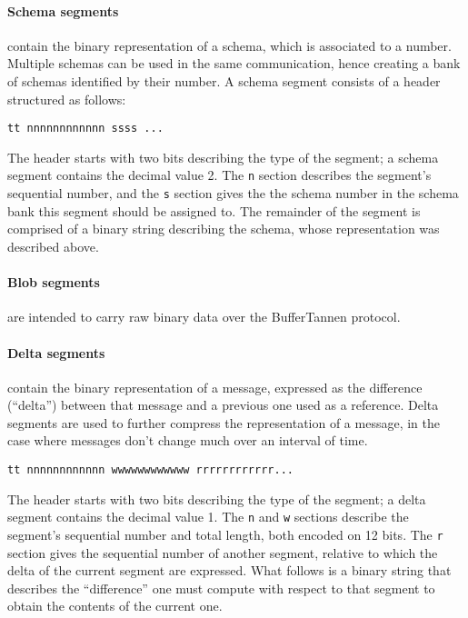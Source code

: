 \paragraph{Schema segments} contain the binary representation of a schema, which is associated to a number. Multiple schemas can be used in the same communication, hence creating a bank of schemas identified by their number. A schema segment consists of a header structured as follows:

\begin{verbatim}
tt nnnnnnnnnnnn ssss ...
\end{verbatim}

The header starts with two bits describing the type of the segment; a schema segment contains the decimal value 2. The \verb+n+ section describes the segment's sequential number, and the \verb+s+ section gives the the schema number in the schema bank this segment should be assigned to. The remainder of the segment is comprised of a binary string describing the schema, whose representation was described above.

\paragraph{Blob segments} are intended to carry raw binary data over the BufferTannen protocol.

\paragraph{Delta segments} contain the binary representation of a message, expressed as the difference (``delta'') between that message and a previous one used as a reference. Delta segments are used to further compress the representation of a message, in the case where messages don't change much over an interval of time.

\begin{verbatim}
tt nnnnnnnnnnnn wwwwwwwwwwww rrrrrrrrrrrr...
\end{verbatim}

The header starts with two bits describing the type of the segment; a delta segment contains the decimal value 1. The \verb+n+ and \verb+w+ sections describe the segment's sequential number and total length, both encoded on 12 bits. The \verb+r+ section gives the sequential number of another segment, relative to which the delta of the current segment are expressed. What follows is a binary string that describes the ``difference'' one must compute with respect to that segment to obtain the contents of the current one.

